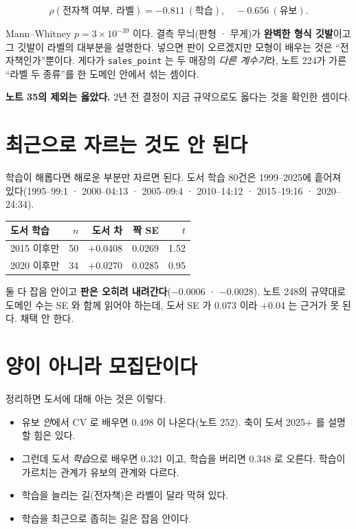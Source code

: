 \documentclass[10pt]{article}
\begin{document}
\[ \rho(\text{전자책 여부},\ \text{라벨}) = -0.811 \ (\text{학습}), \quad
   -0.656 \ (\text{유보}). \]

Mann--Whitney $p = 3\times10^{-39}$ 이다. 결측 무늬(판형 · 무게)가
\textbf{완벽한 형식 깃발}이고 그 깃발이 라벨의 대부분을 설명한다. 넣으면
판이 오르겠지만 모형이 배우는 것은 ``전자책인가''뿐이다. 게다가
\texttt{sales\_point} 는 두 매장의 \emph{다른 계수기}라, 노트 224가 가른
``라벨 두 종류''를 한 도메인 안에서 섞는 셈이다.

\textbf{노트 35의 제외는 옳았다.} 2년 전 결정이 지금 규약으로도 옳다는 것을
확인한 셈이다.

\section{최근으로 자르는 것도 안 된다}

학습이 해롭다면 해로운 부분만 자르면 된다. 도서 학습 80건은 1999--2025에
흩어져 있다(1995--99:1 · 2000--04:13 · 2005--09:4 · 2010--14:12 ·
2015--19:16 · 2020--24:34).

\begin{center}\small
\begin{tabular}{lrrrr}
\hline
도서 학습 & $n$ & 도서 차 & 짝 SE & $t$ \\
\hline
2015 이후만 & 50 & $+$0.0408 & 0.0269 & 1.52 \\
2020 이후만 & 34 & $+$0.0270 & 0.0285 & 0.95 \\
\hline
\end{tabular}
\end{center}

둘 다 잡음 안이고 \textbf{판은 오히려 내려간다}($-$0.0006 · $-$0.0028).
노트 248의 규약대로 도메인 수는 SE 와 함께 읽어야 하는데, 도서 SE 가
0.073 이라 $+$0.04 는 근거가 못 된다. 채택 안 한다.

\section{양이 아니라 모집단이다}

정리하면 도서에 대해 아는 것은 이렇다.

\begin{itemize}
\item 유보 \emph{안}에서 CV 로 배우면 0.498 이 나온다(노트 252). 축이 도서
2025$+$ 를 설명할 힘은 있다.
\item 그런데 도서 \emph{학습}으로 배우면 0.321 이고, 학습을 버리면 0.348 로
오른다. 학습이 가르치는 관계가 유보의 관계와 다르다.
\item 학습을 늘리는 길(전자책)은 라벨이 달라 막혀 있다.
\item 학습을 최근으로 좁히는 길은 잡음 안이다.
\end{itemize}
\end{document}
